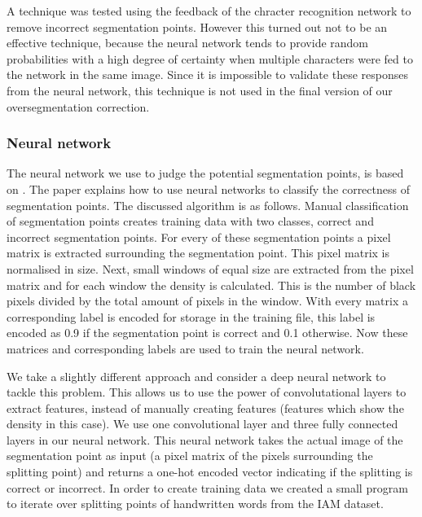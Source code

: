 \documentclass{article}
\begin{document}
A technique was tested using the feedback of the chracter recognition network to remove incorrect segmentation points.
However this turned out not to be an effective technique, because the neural network tends to provide random probabilities with a high degree of certainty when multiple characters were fed to the network in the same image.
Since it is impossible to validate these responses from the neural network, this technique is not used in the final version of our oversegmentation correction.
 

\subsubsection{Neural network}
The neural network we use to judge the potential segmentation points, is based on \citep{evalsplitpointsnn}. The paper explains how to use neural networks to classify the correctness of segmentation points. The discussed algorithm is as follows. Manual classification of segmentation points creates training data with two classes, correct and incorrect segmentation points. 
For every of these segmentation points a pixel matrix is extracted surrounding the segmentation point. This pixel matrix is normalised in size. 
Next, small windows of equal size are extracted from the pixel matrix and for each window the density is calculated. This is the number of black pixels divided by the total amount of pixels in the window. 
With every matrix a corresponding label is encoded for storage in the training file, this label is encoded as 0.9 if the segmentation point is correct and 0.1 otherwise. Now these matrices and corresponding labels are used to train the neural network. 

We take a slightly different approach and consider a deep neural network to tackle this problem. This allows us to use the power of convolutational layers to extract features, instead of manually creating features (features which show the density in this case). 
We use one convolutional layer and three fully connected layers in our neural network. This neural network takes the actual image of the segmentation point as input (a pixel matrix of the pixels surrounding the splitting point) and returns a one-hot encoded vector indicating if the splitting is correct or incorrect. In order to create training data we created a small program to iterate over splitting points of handwritten words from the IAM dataset. \citep{iam}
\end{document}
